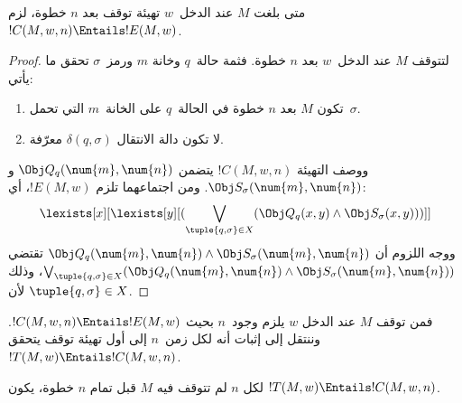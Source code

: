 \documentclass[../../../include/open-logic-section]{subfiles}
\begin{document}
\begin{lem}
متى بلغت $M$ عند الدخل~$w$ تهيئة توقف بعد $n$ خطوة، لزم
$!C(M,w,n)\Entails !E(M,w)$.
\end{lem}

\begin{proof}
لتتوقف $M$ عند الدخل~$w$ بعد $n$ خطوة. فثمة حالة~$q$ وخانة
$m$ ورمز~$\sigma$ تحقق ما يأتي:
\begin{enumerate}
\item تكون $M$ بعد $n$ خطوة في الحالة~$q$ على الخانة~$m$
  التي تحمل~$\sigma$.
\item لا تكون دالة الانتقال $\delta(q,\sigma)$ معرّفة.
\end{enumerate}
ووصف التهيئة $!C(M,w,n)$ يتضمن
$\Obj Q_q(\num{m},\num{n})$ و$\Obj S_\sigma(\num{m},\num{n})$.
ومن اجتماعهما تلزم $!E(M,w)$، أي:
\[
\lexists[x][\lexists[y][(\bigvee_{\tuple{q, \sigma} \in
      X}(\Obj Q_q(x, y) \land \Obj S_\sigma(x, y)))]]
\]
ووجه اللزوم أن $\Obj Q_q(\num{m},\num{n})\land
\Obj S_\sigma(\num{m},\num{n})$ تقتضي
$\bigvee_{\tuple{q,\sigma}\in X}(\Obj Q_q(\num{m},\num{n})\land
\Obj S_\sigma(\num{m},\num{n}))$، وذلك لأن
$\tuple{q,\sigma}\in X$.
\end{proof}

\begin{explain}
فمن توقف $M$ عند الدخل $w$ يلزم وجود~$n$ بحيث
$!C(M,w,n)\Entails !E(M,w)$. وننتقل إلى إثبات أنه لكل زمن~$n$
إلى أول تهيئة توقف يتحقق $!T(M,w)\Entails !C(M,w,n)$.
\end{explain}

\begin{lem}
لكل $n$ لم تتوقف فيه $M$ قبل تمام $n$ خطوة، يكون
$!T(M,w)\Entails !C(M,w,n)$.
\end{lem}
\end{document}
